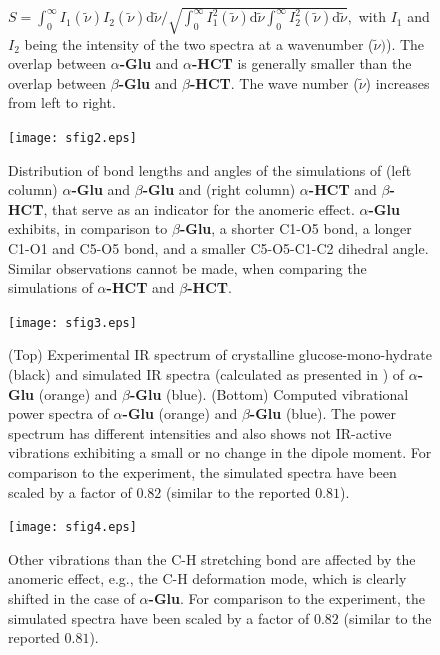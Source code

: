 \documentclass[12pt, english, letter]{article}
\newcommand{\aglu}{\textbf{$\alpha$-Glu}}
\newcommand{\bglu}{\textbf{$\beta$-Glu}}
\newcommand{\ahct}{\textbf{$\alpha$-HCT}}
\newcommand{\bhct}{\textbf{$\beta$-HCT}}
\begin{document}
\begin{figure}[h!]
{			$	
			S = \int_0^\infty I_1(\tilde{\nu}) I_2(\tilde{\nu}) \mathrm{d} \tilde{\nu} /
			\sqrt{\int_0^\infty I_1^2(\tilde{\nu}) \mathrm{d} \tilde{\nu} \int_0^\infty I_2^2(\tilde{\nu}) \mathrm{d}  		\tilde{\nu}} ,
			$
			with $I_1$ and $I_2$ being the intensity of the two spectra at a wavenumber ($\tilde{\nu})$). The overlap between \aglu{} and \ahct{} is generally smaller than the overlap between \bglu{} and \bhct{}. The wave number ($\tilde{\nu}$) increases from left to right.
		}
		\label{fig:glucose_appendix}
	\end{figure}
	
	\newpage
	
	\begin{figure}[h!]
		\centering
		\texttt{[image: sfig2.eps]}
		\caption{%
			Distribution of bond lengths and angles of the simulations of (left column) \aglu{} and \bglu{} and (right column) \ahct{} and \bhct{}, that serve as an indicator for the anomeric effect. \aglu{} exhibits, in comparison to \bglu{}, a shorter C1-O5 bond, a longer C1-O1 and C5-O5 bond, and a smaller C5-O5-C1-C2 dihedral angle. Similar observations cannot be made, when comparing the simulations of \ahct{} and \bhct{}.}
		\label{fig:glucose_distr}
	\end{figure}
	
	\newpage
	
	\begin{figure}[h!]
		\centering
		\texttt{[image: sfig3.eps]}
		\caption{%
			(Top) Experimental IR spectrum of crystalline glucose-mono-hydrate (black) and simulated IR spectra (calculated as presented in \autocite{Peters2017}) of \aglu{} (orange) and \bglu{} (blue). (Bottom) Computed vibrational power spectra of \aglu{} (orange) and \bglu{} (blue). The power spectrum has different intensities and also shows not IR-active vibrations exhibiting a small or no change in the dipole moment. For comparison to the experiment, the simulated spectra have been scaled by a factor of $0.82$ (similar to the reported $0.81$\autocite{Peters2017}).
		}
		\label{fig:ir_vs_pow}
	\end{figure}
	
	\newpage
	
	\begin{figure}[h!]
		\centering
		\texttt{[image: sfig4.eps]}
		\caption{%
			Other vibrations than the C-H stretching bond are affected by the anomeric effect, e.g., the C-H deformation mode, which is clearly shifted in the case of \aglu{}. For comparison to the experiment, the simulated spectra have been scaled by a factor of $0.82$ (similar to the reported $0.81$\autocite{Peters2017}).
		}
		\label{fig:c1_vibration}
	\end{figure}

\newpage

\printbibliography[heading=bibintoc]
\end{document}
